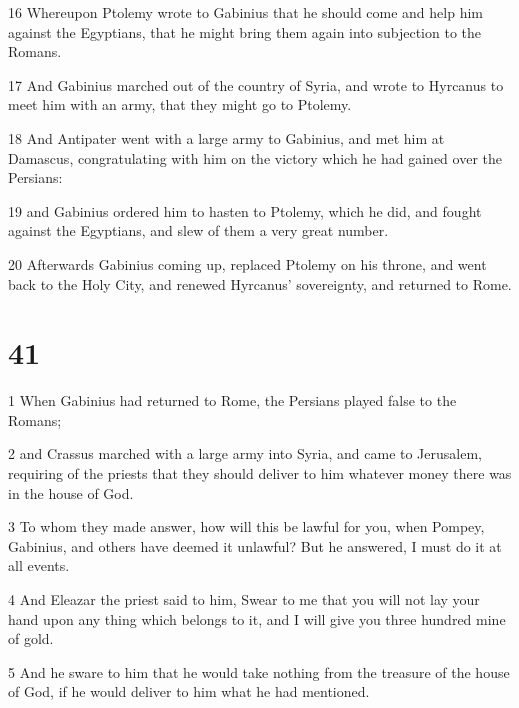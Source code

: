 \par 16 Whereupon Ptolemy wrote to Gabinius that he should come and help him against the Egyptians, that he might bring them again into subjection to the Romans. 

\par 17 And Gabinius marched out of the country of Syria, and wrote to Hyrcanus to meet him with an army, that they might go to Ptolemy. 

\par 18 And Antipater went with a large army to Gabinius, and met him at Damascus, congratulating with him on the victory which he had gained over the Persians: 

\par 19 and Gabinius ordered him to hasten to Ptolemy, which he did, and fought against the Egyptians, and slew of them a very great number. 

\par 20 Afterwards Gabinius coming up, replaced Ptolemy on his throne, and went back to the Holy City, and renewed Hyrcanus’ sovereignty, and returned to Rome. 


\chapter{41}

\par {}

\par 1 When Gabinius had returned to Rome, the Persians played false to the Romans; 

\par 2 and Crassus marched with a large army into Syria, and came to Jerusalem, requiring of the priests that they should deliver to him whatever money there was in the house of God. 

\par 3 To whom they made answer, how will this be lawful for you, when Pompey, Gabinius, and others have deemed it unlawful? But he answered, I must do it at all events. 

\par 4 And Eleazar the priest said to him, Swear to me that you will not lay your hand upon any thing which belongs to it, and I will give you three hundred mine of gold. 

\par 5 And he sware to him that he would take nothing from the treasure of the house of God, if he would deliver to him what he had mentioned. 


